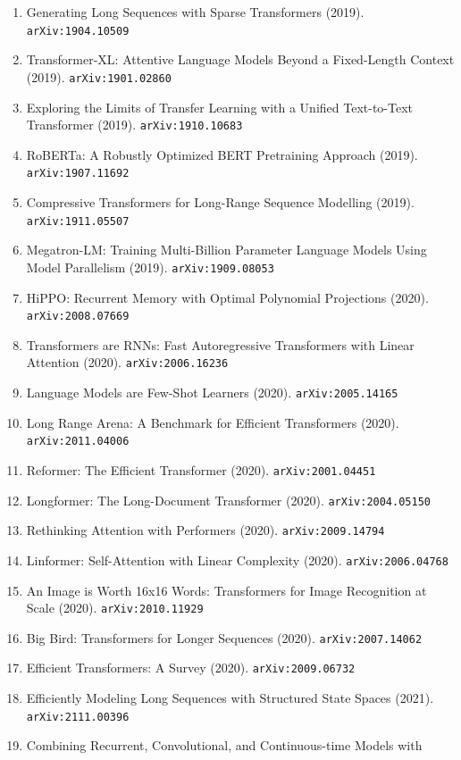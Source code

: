 \documentclass[11pt]{article}
\begin{document}
\begin{enumerate}
  Challenge (2018). \texttt{arXiv:1803.05457}
  \item Generating Long Sequences with Sparse Transformers (2019). \texttt{arXiv:1904.10509}
  \item Transformer-XL: Attentive Language Models Beyond a Fixed-Length Context (2019). \texttt{arXiv:1901.02860}
  \item Exploring the Limits of Transfer Learning with a Unified Text-to-Text
  Transformer (2019). \texttt{arXiv:1910.10683}
  \item RoBERTa: A Robustly Optimized BERT Pretraining Approach (2019). \texttt{arXiv:1907.11692}
  \item Compressive Transformers for Long-Range Sequence Modelling (2019). \texttt{arXiv:1911.05507}
  \item Megatron-LM: Training Multi-Billion Parameter Language Models Using
  Model Parallelism (2019). \texttt{arXiv:1909.08053}
  \item HiPPO: Recurrent Memory with Optimal Polynomial Projections (2020). \texttt{arXiv:2008.07669}
  \item Transformers are RNNs: Fast Autoregressive Transformers with Linear
  Attention (2020). \texttt{arXiv:2006.16236}
  \item Language Models are Few-Shot Learners (2020). \texttt{arXiv:2005.14165}
  \item Long Range Arena: A Benchmark for Efficient Transformers (2020). \texttt{arXiv:2011.04006}
  \item Reformer: The Efficient Transformer (2020). \texttt{arXiv:2001.04451}
  \item Longformer: The Long-Document Transformer (2020). \texttt{arXiv:2004.05150}
  \item Rethinking Attention with Performers (2020). \texttt{arXiv:2009.14794}
  \item Linformer: Self-Attention with Linear Complexity (2020). \texttt{arXiv:2006.04768}
  \item An Image is Worth 16x16 Words: Transformers for Image Recognition at
  Scale (2020). \texttt{arXiv:2010.11929}
  \item Big Bird: Transformers for Longer Sequences (2020). \texttt{arXiv:2007.14062}
  \item Efficient Transformers: A Survey (2020). \texttt{arXiv:2009.06732}
  \item Efficiently Modeling Long Sequences with Structured State Spaces (2021). \texttt{arXiv:2111.00396}
  \item Combining Recurrent, Convolutional, and Continuous-time Models with

\end{enumerate}
\end{document}
